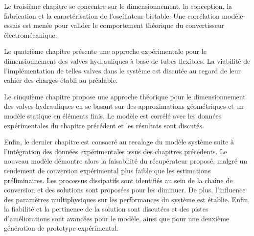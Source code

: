 Le troisième chapitre se concentre sur le dimensionnement, la conception, la fabrication et la caractérisation de l'oscillateur bistable. Une corrélation modèle-essais est menée pour valider le comportement théorique du convertisseur électromécanique.

Le quatrième chapitre présente une approche expérimentale pour le dimensionnement des valves hydrauliques à base de tubes flexibles. La viabilité de l'implémentation de telles valves dans le système est discutée au regard de leur cahier des charges établi au préalable.

Le cinquième chapitre propose une approche théorique pour le dimensionnement des valves hydrauliques en se basant sur des approximations géométriques et un modèle statique en éléments finis. Le modèle est corrélé avec les données expérimentales du chapitre précédent et les résultats sont discutés.

Enfin, le dernier chapitre est consacré au recalage du modèle système suite à l'intégration des données expérimentales issus des chapitres précédents. Le nouveau modèle démontre alors la faisabilité du récupérateur proposé, malgré un rendement de conversion expérimental plus faible que les estimations préliminaires. Les processus dissipatifs sont identifiés au sein de la chaîne de conversion et des solutions sont proposées pour les diminuer. De plus, l'influence des paramètres multiphysiques sur les performances du système est établie. Enfin, la fiabilité et la pertinence de la solution sont discutées et des pistes d'améliorations sont avancées pour le modèle, ainsi que pour une deuxième génération de prototype expérimental.


\newpage
